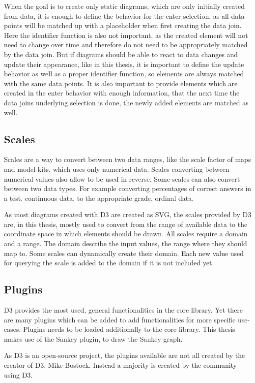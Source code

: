 When the goal is to create only static diagrams, which are only initially created from data, it is enough to define the behavior for the enter selection, as all data points will be matched up with a placeholder when first creating the data join. Here the identifier function is also not important, as the created element will not need to change over time and therefore do not need to be appropriately matched by the data join. But if diagrams should be able to react to data changes and update their appearance, like in this thesis, it is important to define the update behavior as well as a proper identifier function, so elements are always matched with the same data points. It is also important to provide elements which are created in the enter behavior with enough information, that the next time the data joins underlying selection is done, the newly added elements are matched as well.


\subsection{Scales}

Scales are a way to convert between two data ranges, like the scale factor of maps and model-kits, which uses only numerical data. Scales converting between numerical values also allow to be used in reverse. Some scales can also convert between two data types. For example converting percentages of correct answers in a test, continuous data, to the appropriate grade, ordinal data.

As most diagrams created with D3 are created as SVG, the scales provided by D3 are, in this thesis, mostly used to convert from the range of available data to the coordinate space in which elements should be drawn. All scales require a domain and a range. The domain describe the input values, the range where they should map to. Some scales can dynamically create their domain. Each new value used for querying the scale is added to the domain if it is not included yet.

\subsection{Plugins}

D3 provides the most used, general functionalities in the core library. Yet there are many plugins which can be added to add functionalities for more specific use-cases. Plugins needs to be loaded additionally to the core library. This thesis makes use of the Sankey plugin\cite{Sankey_package}, to draw the Sankey graph.

As D3 is an open-source project, the plugins available are not all created by the creator of D3, Mike Bostock. Instead a majority is created by the community using D3.
